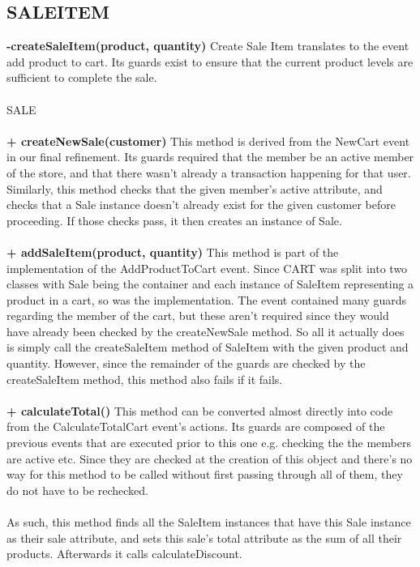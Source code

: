 \documentclass[a4paper]{article}
\begin{document}
\subsection{SALEITEM}
{\bf -createSaleItem(product, quantity)}
Create Sale Item translates to the event add product to cart. Its guards exist to ensure that the current product levels are sufficient to complete the sale.
\\\\
SALE
\\\\
{\bf + createNewSale(customer)}
This method is derived from the NewCart event in our final refinement. Its guards required that the member be an active member of the store, and that there wasn’t already a transaction happening for that user. Similarly, this method checks that the given member’s active attribute, and checks that a Sale instance doesn’t already exist for the given customer before proceeding. If those checks pass, it then creates an instance of Sale.
\\\\
{\bf + addSaleItem(product, quantity)}
This method is part of the implementation of the AddProductToCart event. Since CART was split into two classes with Sale being the container and each instance of SaleItem representing a product in a cart, so was the implementation. The event contained many guards regarding the member of the cart, but these aren’t required since they would have already been checked by the createNewSale method. So all it actually does is simply call the createSaleItem method of SaleItem with the given product and quantity. However, since the remainder of the guards are checked by the createSaleItem method, this method also fails if it fails.
\\\\
{\bf + calculateTotal()}
This method can be converted almost directly into code from the CalculateTotalCart event’s actions. Its guards are composed of the previous events that are executed prior to this one e.g. checking the the members are active etc. Since they are checked at the creation of this object and there’s no way for this method to be called without first passing through all of them, they do not have to be rechecked.
\\\\
As such, this method finds all the SaleItem instances that have this Sale instance as their sale attribute, and sets this sale’s total attribute as the sum of all their products. Afterwards it calls calculateDiscount.
\end{document}
